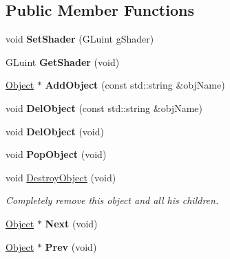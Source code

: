 \subsection*{Public Member Functions}
\begin{DoxyCompactItemize}
\item 
\hypertarget{class_scene_a3010030e68d0468b8d18c1323e072e80}{void {\bfseries Set\-Shader} (G\-Luint g\-Shader)}\label{class_scene_a3010030e68d0468b8d18c1323e072e80}

\item 
\hypertarget{class_scene_a1debf8bc8a9cb168ebbbcda1b4ffd605}{G\-Luint {\bfseries Get\-Shader} (void)}\label{class_scene_a1debf8bc8a9cb168ebbbcda1b4ffd605}

\item 
\hypertarget{class_scene_a2a3a5e4f5ea44d086ff73f2420663a10}{\hyperlink{class_object}{Object} $\ast$ {\bfseries Add\-Object} (const std\-::string \&obj\-Name)}\label{class_scene_a2a3a5e4f5ea44d086ff73f2420663a10}

\item 
\hypertarget{class_scene_a3bd9fa1058f506c04162b9283e97d20e}{void {\bfseries Del\-Object} (const std\-::string \&obj\-Name)}\label{class_scene_a3bd9fa1058f506c04162b9283e97d20e}

\item 
\hypertarget{class_scene_a43fd3c56db5dc940d1724b9573c9a360}{void {\bfseries Del\-Object} (void)}\label{class_scene_a43fd3c56db5dc940d1724b9573c9a360}

\item 
\hypertarget{class_scene_abdfd15e7987aa261840d5ecc265170df}{void {\bfseries Pop\-Object} (void)}\label{class_scene_abdfd15e7987aa261840d5ecc265170df}

\item 
\hypertarget{class_scene_a82759ded1f6f87a91b8d10ed87501958}{void \hyperlink{class_scene_a82759ded1f6f87a91b8d10ed87501958}{Destroy\-Object} (void)}\label{class_scene_a82759ded1f6f87a91b8d10ed87501958}

\begin{DoxyCompactList}\small\item\em Completely remove this object and all his children. \end{DoxyCompactList}\item 
\hypertarget{class_scene_a0a57ee2c15864c55cf3284b937440330}{\hyperlink{class_object}{Object} $\ast$ {\bfseries Next} (void)}\label{class_scene_a0a57ee2c15864c55cf3284b937440330}

\item 
\hypertarget{class_scene_a955c5c984cc6bc5fb532752e43256211}{\hyperlink{class_object}{Object} $\ast$ {\bfseries Prev} (void)}\label{class_scene_a955c5c984cc6bc5fb532752e43256211}


\end{DoxyCompactItemize}
